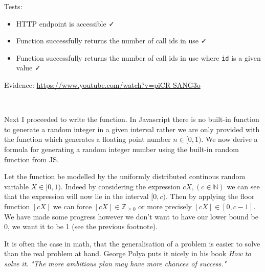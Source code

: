 {\sffamily Tests:}

\begin{itemize}
  \item HTTP endpoint is accessible \faCheck \\
  \item Function successfully returns the number of call ids in use \faCheck \\
  \item Function successfully returns the number of call ids in use where \texttt{id} is a given value \faCheck \\
\end{itemize}

{\sffamily Evidence:} \url{https://www.youtube.com/watch?v=piCR-SANG3o}\\ \vspace{0.2cm}

{\color{gray} \hrulefill} \\ \vspace{0.2cm}

Next I proceeded to write the 
function. In Javascript there is no built-in function to
generate a random integer in a given interval rather we
are only provided with the  function
which generates a floating point number $n \in [0, 1)$.
We now derive a formula for generating a random integer
number using the built-in random function from JS. \\ \vspace{0.2cm}

Let the  function be modelled by
the uniformly distributed continous random variable
$X \in [0, 1)$. Indeed by considering the expression
$cX, (c \in \mathbb{N})$ we can see that the
expression will now lie in the interval $[0, c)$. Then by
applying the floor function
$\left \lfloor {cX} \right \rfloor$ we can force
$\left \lfloor {cX} \right \rfloor \in \mathbb{Z}_{\geq 0}$
or more precisely
$\left \lfloor {cX} \right \rfloor \in [0, c-1]$. We have
made some progress however we don't want to have our lower
bound be 0, we want it to be 1 (see the previous footnote).\\
\vspace{0.2cm}

It is often the case in math, that the generalisation of a
problem is easier to solve than the real problem at hand.
George Polya puts it nicely in his book \textit{How to solve
it}. \textit{"The more ambitious plan may have more chances
of success."} \\ \vspace{0.2cm}

